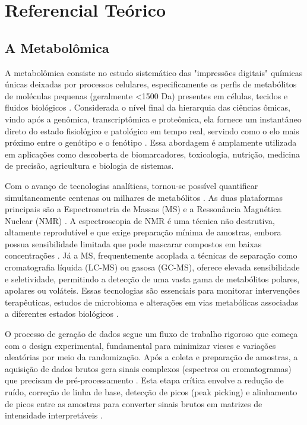% 


\chapter[Referencial Teórico]{Referencial Teórico}

{\section{\textbf{A Metabolômica}}}

A metabolômica consiste no estudo sistemático das "impressões digitais" químicas únicas deixadas por processos celulares, especificamente os perfis de metabólitos de moléculas pequenas (geralmente <1500 Da) presentes em células, tecidos e fluidos biológicos \cite{LILAND2011827,picone2026integrating}. Considerada o nível final da hierarquia das ciências ômicas, vindo após a genômica, transcriptômica e proteômica, ela fornece um instantâneo direto do estado fisiológico e patológico em tempo real, servindo como o elo mais próximo entre o genótipo e o fenótipo \cite{picone2026integrating,LILAND2011827,anwardeen2023statistical}. Essa abordagem é amplamente utilizada em aplicações como descoberta de biomarcadores, toxicologia, nutrição, medicina de precisão, agricultura e biologia de sistemas.

Com o avanço de tecnologias analíticas, tornou-se possível quantificar simultaneamente centenas ou milhares de metabólitos \cite{li2016performance}. As duas plataformas principais são a Espectrometria de Massas (MS) e a Ressonância Magnética Nuclear (NMR) \cite{anwardeen2023statistical}. A espectroscopia de NMR é uma técnica não destrutiva, altamente reprodutível e que exige preparação mínima de amostras, embora possua sensibilidade limitada que pode mascarar compostos em baixas concentrações \cite{mayonu2026evaluation}. Já a MS, frequentemente acoplada a técnicas de separação como cromatografia líquida (LC-MS) ou gasosa (GC-MS), oferece elevada sensibilidade e seletividade, permitindo a detecção de uma vasta gama de metabólitos polares, apolares ou voláteis. Essas tecnologias são essenciais para monitorar intervenções terapêuticas, estudos de microbioma e alterações em vias metabólicas associadas a diferentes estados biológicos \cite{pang2024metaboanalyst}.

O processo de geração de dados segue um fluxo de trabalho rigoroso que começa com o design experimental, fundamental para minimizar vieses e variações aleatórias por meio da randomização. Após a coleta e preparação de amostras, a aquisição de dados brutos gera sinais complexos (espectros ou cromatogramas) que precisam de pré-processamento \cite{LILAND2011827,anwardeen2023statistical}. Esta etapa crítica envolve a redução de ruído, correção de linha de base, detecção de picos (peak picking) e alinhamento de picos entre as amostras para converter sinais brutos em matrizes de intensidade interpretáveis \cite{sun2024pretreating}.

